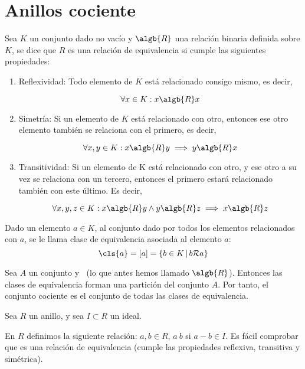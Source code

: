 \section{Anillos cociente}
\begin{defn}
	Sea $K$ un conjunto dado no vacío y $\algb{R}$ una relación binaria definida sobre $K$, se dice que $R$ es una relación de equivalencia si cumple las siguientes propiedades:
	\begin{enumerate}
		\item Reflexividad: Todo elemento de $K$ está relacionado consigo mismo, es decir,

		$$\forall x \in K: x \algb{R} x$$
		\item Simetría: Si un elemento de $K$ está relacionado con otro, entonces ese otro elemento también se relaciona con el primero, es decir,

		$$\forall x,y \in K: x \algb{R} y \implies y \algb{R} x$$

		\item Transitividad:  Si un elemento de K está relacionado con otro, y ese otro a su vez se relaciona con un tercero, entonces el primero estará relacionado también con este último. Es decir,

		$$\forall x,y,z \in K: x \algb{R} y \wedge y \algb{R} z \implies x \algb{R} z$$
	\end{enumerate}
\end{defn}

\begin{defn}
	Dado un elemento $a\in K$, al conjunto dado por todos los elementos relacionados con $a$, se le llama clase de equivalencia asociada al elemento $a$:
	$$ \cls{a}=[a] = \{b\in K\,|\,b\mathcal{R}a\} $$
\end{defn}

\begin{defn}
	Sea $A$ un conjunto y $~$ (lo que antes hemos llamado $\algb{R}$). Entonces las clases de equivalencia forman una partición del conjunto $A$. Por tanto, el conjunto cociente es el conjunto de todas las clases de equivalencia.
\end{defn}


Sea $R$ un anillo, y sea $I\subset R$ un ideal.

En $R$ definimos la siguiente relación: $a,b \in R$, $a~b$ si $a-b \in I$. Es fácil comprobar que es una relación de equivalencia (cumple las propiedades reflexiva, transitiva y simétrica).

